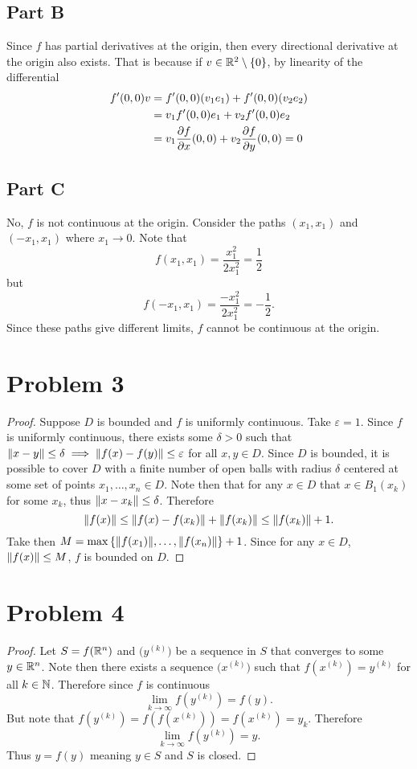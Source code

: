 \documentclass{eeleyes}
\newcommand\eps{\varepsilon}
\begin{document}
\subsection*{Part B}
Since $f$ has partial derivatives at the origin, then every directional derivative at the origin also exists. That is because if $v \in \mathbb{R}^2 \setminus \qty{0}$, by linearity of the differential
\begin{align*}
    f'(0,0) v &= f'(0,0) (v_1 e_1) + f'(0,0) (v_2 e_2) \\
    &= v_1 f'(0,0) e_1 + v_2 f'(0,0) e_2 \\
    &= v_1 \pdv{f}{x}\relax(0,0) + v_2 \pdv{f}{y}\relax(0,0) = 0
\end{align*}

\subsection*{Part C}
No, $f$ is not continuous at the origin. Consider the paths $(x_1, x_1)$ and $(-x_1, x_1)$ where $x_1 \to 0$. Note that
\[
    f(x_1, x_1) = \frac{x_1^2}{2x_1^2} = \frac{1}{2}
\]
but
\[
    f(-x_1, x_1) = \frac{-x_1^2}{2x_1^2} = -\frac{1}{2}
.\]
Since these paths give different limits, $f$ cannot be continuous at the origin.

\section*{Problem 3}
\begin{proof}
    Suppose $D$ is bounded and $f$ is uniformly continuous. Take $\eps = 1$. Since $f$ is uniformly continuous, there exists some $\delta > 0$ such that $\norm{x - y} \leq \delta \implies \norm{f(x) - f(y)} \leq \eps$ for all $x,y \in D$. Since $D$ is bounded, it is possible to cover $D$ with a finite number of open balls with radius $\delta$ centered at some set of points $x_1, \ldots, x_n \in D$. Note then that for any $x \in D$ that $x \in B_{1}(x_k)$ for some $x_k$, thus $\norm{x - x_k} \leq \delta$. Therefore
    \[
        \norm{f(x)} \leq \norm{f(x) - f(x_k)} + \norm{f(x_k)} \leq \norm{f(x_k)} + 1
    .\]
    Take then $M = \max\qty{\norm{f(x_1)}, \ldots, \norm{f(x_n)}} + 1$. Since for any $x \in D$, $\norm{f(x)} \leq M$, $f$ is bounded on $D$.
\end{proof}

\section*{Problem 4}
\begin{proof}
    Let $S = f(\mathbb{R}^n)$ and $\bigl(y^{(k)}\bigr)$ be a sequence in $S$ that converges to some $y \in \mathbb{R}^n$. Note then there exists a sequence $\bigl(x^{(k)}\bigr)$ such that $f(x^{(k)}) = y^{(k)}$ for all $k \in \mathbb{N}$. Therefore since $f$ is continuous
    \[
        \lim_{k \to \infty} f(y^{(k)}) = f(y)
    .\]
    But note that $f(y^{(k)}) = f(f(x^{(k)})) = f(x^{(k)}) = y_k$. Therefore
    \[
        \lim_{k \to \infty} f(y^{(k)}) = y
    .\]
    Thus $y = f(y)$ meaning $y \in S$ and $S$ is closed.
\end{proof}
\end{document}
